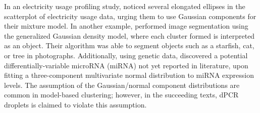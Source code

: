 In an electricity usage profiling study,  noticed several elongated ellipses in the scatterplot of electricity usage data, urging them to use Gaussian components for their mixture model. In another example, \cite{Choy2017} performed image segmentation using the generalized Gaussian density model, where each cluster formed is interpreted as an object. Their algorithm was able to segment objects such as a starfish, cat, or tree in photographs. Additionally, using genetic data,  discovered a potential differentially-variable microRNA (miRNA) not yet reported in literature, upon fitting a three-component multivariate normal distribution to miRNA expression levels. The assumption of the Gaussian/normal component distributions are common in model-based clustering; however, in the succeeding texts, dPCR droplets is claimed to violate this assumption. 


